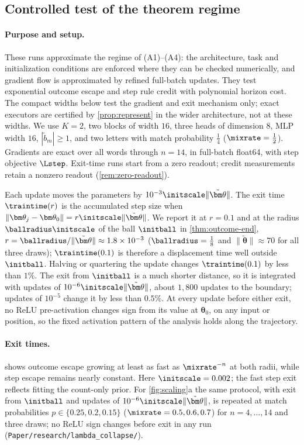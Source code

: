 \subsection{Controlled test of the theorem regime}
\label{app:exp-regime}
\label{app:regime}
\paragraph{Purpose and setup.} These runs approximate the regime of (A1)--(A4): the architecture, task and initialization conditions are enforced where
they can be checked numerically, and gradient flow is approximated by refined full-batch updates. They test exponential outcome
escape and step rule credit with polynomial horizon cost. The compact widths below test the gradient and exit mechanism only;
exact executors are certified by \cref{prop:represent} in the wider architecture, not at these widths.
We use $K=2$, two blocks of width $16$, three heads of dimension $8$, MLP width $16$, $|\tilde b_m|\ge1$,
and two letters with match probability $\tfrac{1}{4}$ ($\mixrate=\tfrac{1}{2}$). Gradients are exact over all words through $n=14$,
in full-batch float64, with step objective $\Lstep$. Exit-time runs start from a zero readout; credit measurements retain a
nonzero readout (\cref{rem:zero-readout}).

Each update moves the parameters by $10^{-3}\initscale\|\tilde{\bm\theta}\|$.
The exit time $\traintime(r)$ is the accumulated step size when $\|\bm\theta_j-\bm\theta_0\|=r\initscale\|\tilde{\bm\theta}\|$. We report it at
$r=0.1$ and at the radius $\ballradius\initscale$ of the ball $\initball$ in \cref{thm:outcome-end}, $r=\ballradius/\|\tilde{\bm\theta}\|\approx1.8\times10^{-3}$
($\ballradius=\tfrac{1}{8}$ and $\|\tilde{\bm\theta}\|\approx70$ for all three draws); $\traintime(0.1)$ is therefore a displacement time well outside $\initball$.
Halving or quartering the update changes $\traintime(0.1)$ by less than $1\%$. The exit from $\initball$ is a much shorter distance, so
it is integrated with updates of $10^{-6}\initscale\|\tilde{\bm\theta}\|$, about $1{,}800$ updates to the boundary; updates of $10^{-5}$ change it by
less than $0.5\%$. At every update before either exit, no ReLU pre-activation
changes sign from its value at $\bm\theta_0$, on any input or position, so the fixed activation pattern of the analysis holds along the trajectory.

\paragraph{Exit times.}  shows outcome escape growing at least as fast as
$\mixrate^{-n}$ at both radii, while step escape remains nearly constant. Here $\initscale=0.002$; the fast step exit reflects fitting the
count-only prior. For \cref{fig:scaling}a the same protocol, with exit from $\initball$ and updates of $10^{-6}\initscale\|\tilde{\bm\theta}\|$, is
repeated at match probabilities $p\in\{0.25,0.2,0.15\}$ ($\mixrate=0.5,0.6,0.7$) for $n=4,\ldots,14$ and three draws; no ReLU sign changes
before exit in any run (\texttt{Paper/research/lambda\_collapse/}).

